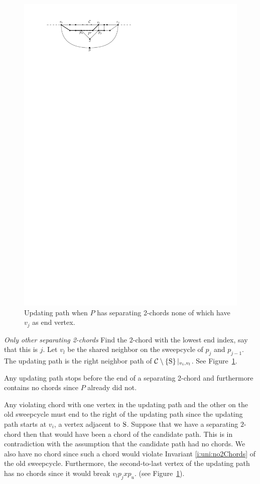 \begin{figure}[t]
      \includegraphics[scale=1]{unifiedAlgo/img/sweep/cases/free2chord}
      \caption{Updating path when $P$ has separating 2-chords none of which have $v_j$ as end vertex.}
      \label{fig:sweep:free2chord}
    \end{figure}

    \emph{Only other separating 2-chords}
      Find the $2$-chord with the lowest end index, say that this is $j$.
      Let $v_l$ be the shared neighbor on the sweepcycle of $p_{j}$ and $p_{j-1}$.
      The updating path is the right neighbor path of $\mathcal{C} \setminus \left\lbrace {\mathrm{S}} \right\rbrace|_{v_i, v_l}$. See Figure~\ref{fig:sweep:free2chord}.

      Any updating path stops before the end of a separating 2-chord and furthermore contains no chords since $P$ already did not.

      Any violating chord with one vertex in the updating path and the other on the old sweepcycle must end to the right of the updating path since the updating path starts at $v_i$, a vertex adjacent to $\mathrm{S}$.
      Suppose that we have a separating $2$-chord then that would have been a chord of the candidate path. This is in contradiction with the assumption that the candidate path had no chords.
      We also have no chord since such a chord would violate Invariant \ref{i:uni:no2Chords} of the old sweepcycle. Furthermore, the second-to-last vertex of the updating path has no chords since it would break $v_l p_j x p_u$. (see Figure~\ref{fig:sweep:free2chord}).

